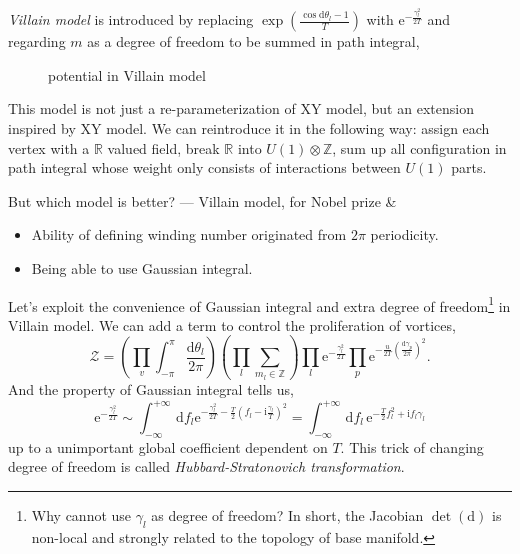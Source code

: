 \emph{Villain model} is introduced by replacing $\exp \left( \frac{\cos \mathrm{d} \theta_{l} - 1}{T} \right)$ with $\mathrm{e}^{- \frac{\gamma_{l}^{2}}{2T}}$ and regarding $m$ as a degree of freedom to be summed in path integral,
\begin{figure}[ht]
    \centering
    \caption{potential in Villain model}
    \label{fig:potential-in-villain-model}
\end{figure}

This model is not just a re-parameterization of XY model, but an extension inspired by XY model. We can reintroduce it in the following way: assign each vertex with a $\mathbb{R}$ valued field, break $\mathbb{R}$ into $U(1) \otimes \mathbb{Z}$, sum up all configuration in path integral whose weight only consists of interactions between $U(1)$ parts.

But which model is better? --- Villain model, for Nobel prize \&
\begin{itemize}
  \item Ability of defining winding number originated from $2\pi $ periodicity.
  \item Being able to use Gaussian integral.
\end{itemize}

Let's exploit the convenience of Gaussian integral and extra degree of freedom\footnote{
  Why cannot use $\gamma_{l}$ as degree of freedom? In short, the Jacobian $\det \left( \mathrm{d}  \right)$ is non-local and strongly related to the topology of base manifold.
} in Villain model. We can add a term to control the proliferation of vortices,
\begin{equation}
  \mathcal{Z} = \left( \prod_{v} \int _{-\pi }^{\pi } \frac{\mathrm{d} \theta_{l}}{2\pi } \right) \left( \prod_{l} \sum_{m_l \in \mathbb{Z}}  \right) \prod_{l} \mathrm{e}^{- \frac{\gamma_{l}^{2}}{2T}} \prod_{p} \mathrm{e}^{- \frac{u}{2T} \left( \frac{\mathrm{d} \gamma_{p}}{2\pi } \right)^{2}}.
\end{equation}
 And the property of Gaussian integral tells us,
\begin{equation}
  \mathrm{e}^{-\frac{\gamma_{l}^{2}}{2T}} \sim \int_{-\infty}^{+\infty} \, \mathrm{d}f_l \mathrm{e}^{- \frac{\gamma_{l}^{2}}{2T} - \frac{T}{2} \left( f_l - \mathrm{i} \frac{\gamma_{l}}{T} \right)^{2}} = \int_{-\infty}^{+\infty} \, \mathrm{d}f_l \,\mathrm{e}^{- \frac{T}{2} f_l^{2} + \mathrm{i} f_l \gamma_{l}}
\end{equation}
up to a unimportant global coefficient dependent on $T$.
This trick of changing degree of freedom is called \emph{Hubbard-Stratonovich transformation}.

